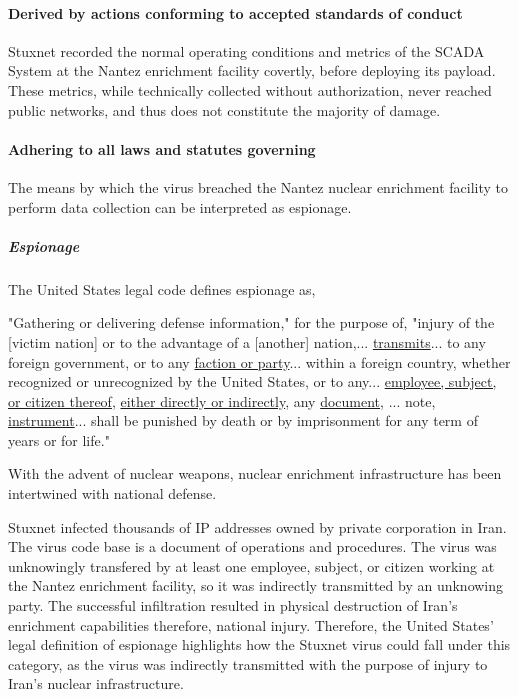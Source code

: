 \documentclass[12pt]{article}
\begin{document}
\begin{multicols}{2}
\paragraph{Derived by actions conforming to accepted standards of conduct}

Stuxnet recorded the normal operating conditions and metrics of the SCADA System at the Nantez enrichment facility covertly, before deploying its payload. These metrics, while technically collected without authorization, never reached public networks, and thus does not constitute the majority of damage.

\paragraph{Adhering to all laws and statutes governing}

The means by which the virus breached the Nantez nuclear enrichment facility to perform data collection can be interpreted as espionage.

\subparagraph{Espionage}

The United States legal code defines espionage as,

\begin{displayquote}
"Gathering or delivering defense information," for the purpose of, "injury of the [victim nation] or to the advantage of a [another] nation,... \ul{transmits}... to any foreign government, or to any \ul{faction or party}... within a foreign country, whether recognized or unrecognized by the United States, or to any... \ul{employee, subject, or citizen thereof}, \ul{either directly or indirectly}, any \ul{document}, ... note, \ul{instrument}... shall be punished by death or by imprisonment for any term of years or for life."\cite{USEspionageLegalDefinition}
\end{displayquote}

With the advent of nuclear weapons, nuclear enrichment infrastructure has been intertwined with national defense.

Stuxnet infected thousands of IP addresses owned by private corporation in Iran. The virus code base is a document of operations and procedures. The virus was unknowingly transfered by at least one employee, subject, or citizen working at the Nantez enrichment facility, so it was indirectly transmitted by an unknowing party. The successful infiltration resulted in physical destruction of Iran's enrichment capabilities therefore, national injury. Therefore, the United States' legal definition of espionage highlights how the Stuxnet virus could fall under this category, as the virus was indirectly transmitted with the purpose of injury to Iran's nuclear infrastructure.


\end{multicols}
\end{document}
